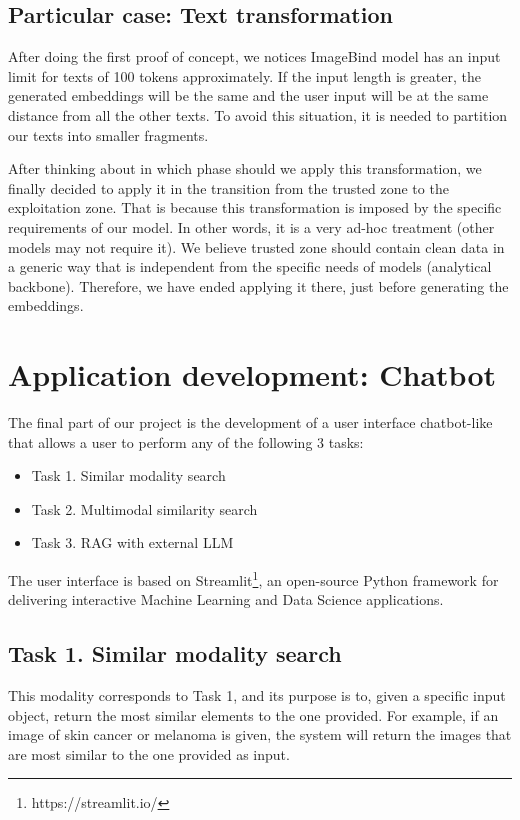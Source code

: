 \documentclass[12pt]{article}
\begin{document}
\subsection{Particular case: Text transformation}
After doing the first proof of concept, we notices ImageBind model has an input limit for texts of 100 tokens approximately. If the input length is greater, the generated embeddings will be the same and the user input will be at the same distance from all the other texts. To avoid this situation, it is needed to partition our texts into smaller fragments.

After thinking about in which phase should we apply this transformation, we finally decided to apply it in the transition from the trusted zone to the exploitation zone. That is because this transformation is imposed by the specific requirements of our model. In other words, it is a very ad-hoc treatment (other models may not require it). We believe trusted zone should contain clean data in a generic way that is independent from the specific needs of models (analytical backbone). Therefore, we have ended applying it there, just before generating the embeddings.

\section{Application development: Chatbot}
The final part of our project is the development of a user interface chatbot-like that allows a user to perform any of the following 3 tasks:
\begin{itemize}
    \item Task 1. Similar modality search
    \item Task 2. Multimodal similarity search
    \item Task 3. RAG with external LLM
\end{itemize}

The user interface is based on Streamlit\footnote{https://streamlit.io/}, an open-source Python framework for delivering interactive Machine Learning and Data Science applications. 

\subsection{Task 1. Similar modality search}
This modality corresponds to Task 1, and its purpose is to, given a specific input object, return the most similar elements to the one provided.
For example, if an image of skin cancer or melanoma is given, the system will return the images that are most similar to the one provided as input.
\end{document}
